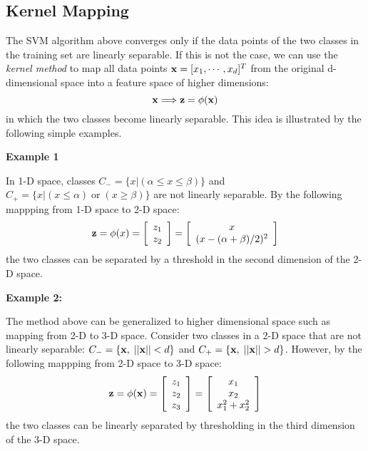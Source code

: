 \documentclass{article}
\begin{document}
\subsection{Kernel Mapping}

The SVM algorithm above converges only if the data points of the
two classes in the training set are linearly separable. If this is
not the case, we can use the {\em kernel method} to map all data 
points ${\bf x}=[x_1,\cdots,x_d]^T$ from the original d-dimensional 
space into a feature space of higher dimensions:
\begin{equation}
  {\bf x} \Longrightarrow {\bf z}=\phi({\bf x})	
\end{equation}
in which the two classes become linearly separable. This idea is
illustrated by the following simple examples.

{\bf Example 1} 

In 1-D space, classes $C_-=\{x\big|(\alpha\le x\le\beta)\}$ 
and $C_+=\{x\big|(x\le \alpha)\;\mbox{or}\;(x\ge\beta)\}$ are not
linearly separable. By the following mappping from 1-D space to 2-D 
space:
\begin{equation}
  {\bf z}=\phi(x)=\left[\begin{array}{l}z_1\\z_2\end{array}\right]
  =\left[ \begin{array}{c} x \\ (x-(\alpha+\beta)/2)^2 \end{array}\right]
\end{equation}
the two classes can be separated by a threshold in the second
dimension of the 2-D space. 


{\bf Example 2:} 

The method above can be generalized to higher dimensional space 
such as mapping from 2-D to 3-D space. Consider two classes in
a 2-D space that are not linearly separable:
$C_-=\{{\bf x},\; ||{\bf x}||<d\}$ and 
$C_+=\{{\bf x},\; ||{\bf x}||>d\}$. However, by the 
following mappping from 2-D space to 3-D space:
\begin{equation}
  {\bf z}=\phi({\bf x})=\left[\begin{array}{l}z_1\\z_2\\z_3\end{array}\right]
  =\left[\begin{array}{c}x_1\\x_2\\x_1^2+x_2^2\end{array}\right]
\end{equation}
the two classes can be linearly separated by thresholding in the 
third dimension of the 3-D space.
\end{document}
